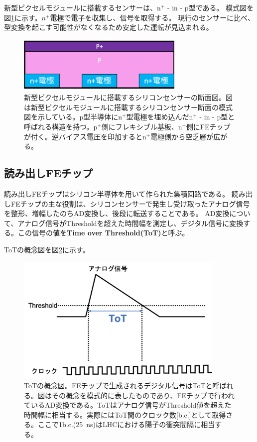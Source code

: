 新型ピクセルモジュールに搭載するセンサーは、n${}^+$ - in - p型である。
模式図を図\ref{sensor_image}に示す。$n^+$電極で電子を収集し、信号を取得する。
現行のセンサーに比べ、型変換を起こす可能性がなくなるため安定した運転が見込まれる\cite{1-3}。

\begin{figure}[bpt]\centering
\includegraphics[width=8cm]{sensor_image}
\caption[新型ピクセルモジュールに搭載するシリコンセンサーの断面図]{新型ピクセルモジュールに搭載するシリコンセンサーの断面図。図は新型ピクセルモジュールに搭載するシリコンセンサー断面の模式図を示している。p型半導体にn${}^+$型電極を埋め込んだn${}^+$ - in - p型と呼ばれる構造を持つ。p${}^+$側にフレキシブル基板、n${}^+$側にFEチップが付く。逆バイアス電圧を印加するとn${}^+$電極側から空乏層が広がる。}
\label{sensor_image}
\end{figure}

\subsection{読み出しFEチップ}
読み出しFEチップはシリコン半導体を用いて作られた集積回路である。
読み出しFEチップの主な役割は、シリコンセンサーで発生し受け取ったアナログ信号を整形、増幅したのちAD変換し、後段に転送することである。
AD変換について、アナログ信号がThresholdを超えた時間幅を測定し、デジタル信号に変換する。この信号の値を\textbf{Time over Threshold(ToT)}と呼ぶ。

ToTの概念図を図\ref{tot_algorithm}に示す。

\begin{figure}[bpt]\centering
\includegraphics[width=10cm]{tot_algorithm}
\caption[ToTの概念図]{ToTの概念図。FEチップで生成されるデジタル信号はToTと呼ばれる。図はその概念を模式的に表したものであり、FEチップで行われているAD変換である。ToTはアナログ信号がThreshold値を超えた時間幅に相当する。実際にはToT間のクロック数[b.c.]として取得さる。ここで1b.c.(25~ns)はLHCにおける陽子の衝突間隔に相当する。}
\label{tot_algorithm}
\end{figure}

